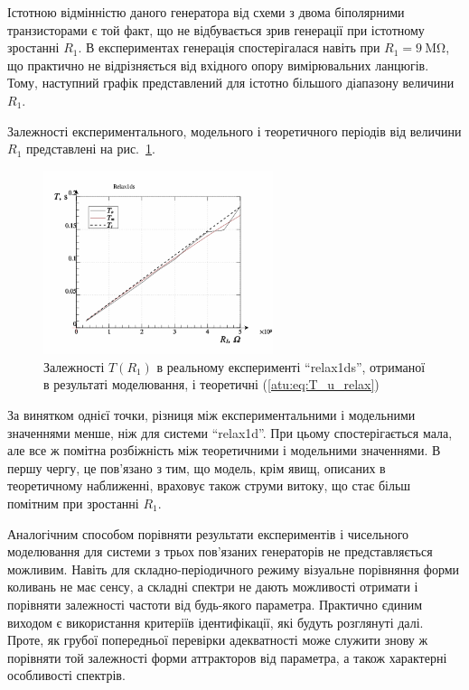 Істотною відмінністю даного генератора від схеми з двома
біполярними транзисторами є той факт, що не відбувається зрив
генерації при істотному зростанні
$R_1$. В експериментах генерація спостерігалася навіть при
$ R_1 = \SI{9}{\mega \ohm} $, що практично не відрізняється від вхідного
опору вимірювальних ланцюгів. Тому, наступний графік
представлений для істотно більшого діапазону величини
$R_1$.

Залежності експериментального, модельного і теоретичного періодів
від величини
$ R_1 $ представлені на рис.~\ref{atu:f:relax1ds_read_cmp-p_R1_T}.


\begin{figure}[htb!]
  \centerline{\includegraphics[width=0.6\textwidth]{p/relax1ds_read_cmp-p_R1_T.png} }
\caption{Залежності $ T (R_1) $ в реальному експерименті ``relax1ds'', отриманої в результаті моделювання, і теоретичні (\ref{atu:eq:T_u_relax})}
\label{atu:f:relax1ds_read_cmp-p_R1_T}
\end{figure}

За винятком однієї точки, різниця між експериментальними
і модельними значеннями менше, ніж для системи ``relax1d''. При
цьому спостерігається мала, але все ж помітна розбіжність між
теоретичними і модельними значеннями. В першу чергу, це пов'язано
з тим, що модель, крім явищ, описаних в теоретичному наближенні,
враховує також струми витоку, що стає більш помітним при
зростанні $R_1$.

Аналогічним способом порівняти результати експериментів
і чисельного моделювання для системи з трьох пов'язаних
генераторів не представляється можливим. Навіть для
складно-періодичного режиму візуальне порівняння форми
коливань не має сенсу, а складні спектри не дають можливості
отримати і порівняти залежності частоти від будь-якого
параметра. Практично єдиним виходом є використання критеріїв
ідентифікації, які будуть розглянуті далі. Проте, як грубої
попередньої перевірки адекватності може служити знову ж
порівняти той залежності форми аттракторов від параметра, а
також характерні особливості спектрів.

